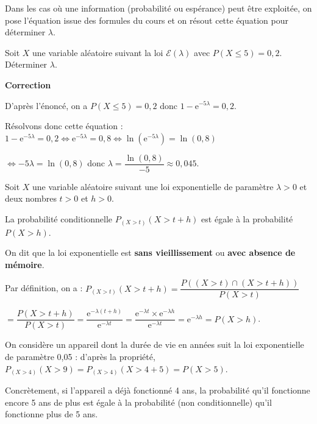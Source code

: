 \documentclass{cornouaille}
\begin{document}
\begin{methode}
Dans les cas où une information (probabilité ou espérance) peut être exploitée, on pose l'équation issue des formules du cours et on résout cette équation pour déterminer $\lambda$.

\exercice

Soit $X$ une variable aléatoire suivant la loi $\mathcal{E}(\lambda)$ avec $P(X\leqslant 5)=0,2$.
Déterminer $\lambda$.

\textbf{Correction}

D'après l'énoncé, on a $P(X\leqslant 5)=0,2$ donc $1-\textrm{e}^{-5 \lambda }=0,2$.

Résolvons donc cette équation : $1-\textrm{e}^{-5\lambda }=0,2 \Leftrightarrow \textrm{e}^{-5\lambda }=0,8 \Leftrightarrow \ln\left(\textrm{e}^{-5\lambda}\right)=\ln(0,8)$

$\Leftrightarrow -5\lambda=\ln(0,8)$ donc $\lambda = \dfrac{\ln(0,8)}{-5}\approx 0,045$.
\end{methode}





\begin{propriete}
Soit $X$ une variable aléatoire suivant une loi exponentielle de paramètre $\lambda>0$ et deux nombres $t>0$ et $h>0$.

La probabilité conditionnelle $P_{(X>t)}\left(X>t+h\right)$ est égale à la probabilité $P(X>h)$.

On dit que la loi exponentielle est \textbf{sans vieillissement} ou \textbf{avec absence de mémoire}.

\end{propriete}




\begin{preuve}
Par définition, on a : $P_{(X>t)}(X>t+h)=\dfrac{P((X>t)\cap (X>t+h))}{P(X>t)}$

$=\dfrac{P(X>t+h)}{P(X>t)}=\dfrac{\textrm{e}^{-\lambda(t+h)}}{\textrm{e}^{-\lambda t}}=\dfrac{\textrm{e}^{-\lambda t} \times \textrm{e}^{-\lambda h}}{\textrm{e}^{-\lambda t}}=\textrm{e}^{-\lambda h}=P(X>h)$.
\end{preuve}



\begin{exemple}
On considère un appareil dont la durée de vie en années suit la loi exponentielle de paramètre 0,05 : d'après la propriété, $P_{(X>4)}\left(X>9\right)=P_{(X>4)}\left(X>4+5\right)=P(X>5)$.

Concrètement, si l'appareil a déjà fonctionné 4 ans, la probabilité
qu'il fonctionne encore 5 ans de plus est égale à la probabilité (non
conditionnelle) qu'il fonctionne plus de 5 ans.
\end{exemple}
\end{document}
